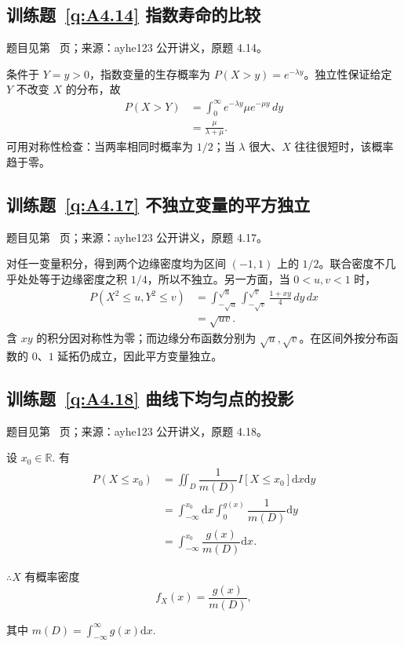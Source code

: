 \documentclass[UTF8,12pt,a4paper,fontset=fandol]{ctexbook}
\begin{document}
\subsection*{训练题~\ref{q:A4.14} 指数寿命的比较}\label{a:A4.14}{\small 题目见第~\pageref{q:A4.14} 页；来源：ayhe123 公开讲义，原题 4.14。}
\begin{solve}条件于 $Y=y>0$，指数变量的生存概率为 $P(X>y)=e^{-\lambda y}$。独立性保证给定 $Y$ 不改变 $X$ 的分布，故\[\begin{aligned}P(X>Y)&=\int_0^\infty e^{-\lambda y}\mu e^{-\mu y}\,dy\\&=\frac\mu{\lambda+\mu}.\end{aligned}\]可用对称性检查：当两率相同时概率为 $1/2$；当 $\lambda$ 很大、$X$ 往往很短时，该概率趋于零。\end{solve}

\subsection*{训练题~\ref{q:A4.17} 不独立变量的平方独立}\label{a:A4.17}{\small 题目见第~\pageref{q:A4.17} 页；来源：ayhe123 公开讲义，原题 4.17。}
\begin{solve}对任一变量积分，得到两个边缘密度均为区间 $(-1,1)$ 上的 $1/2$。联合密度不几乎处处等于边缘密度之积 $1/4$，所以不独立。另一方面，当 $0<u,v<1$ 时，\[\begin{aligned}P(X^2\le u,Y^2\le v)&=\int_{-\sqrt u}^{\sqrt u}\int_{-\sqrt v}^{\sqrt v}\frac{1+xy}{4}\,dy\,dx\\&=\sqrt{uv}.\end{aligned}\]含 $xy$ 的积分因对称性为零；而边缘分布函数分别为 $\sqrt u,\sqrt v$。在区间外按分布函数的 $0$、$1$ 延拓仍成立，因此平方变量独立。\end{solve}

\subsection*{训练题~\ref{q:A4.18} 曲线下均匀点的投影}\label{a:A4.18}{\small 题目见第~\pageref{q:A4.18} 页；来源：ayhe123 公开讲义，原题 4.18。}
\begin{solve}
    设 $x_0\in\mathbb{R}$. 有
    \begin{align*}
        P(X\leq x_0) & =\iint_D\dfrac{1}{m(D)}I[X\leq x_0]\mathrm{d}x\mathrm{d}y \\
        & =\int_{-\infty}^{x_0}\mathrm{d}x\int_0^{g(x)}\dfrac{1}{m(D)}\mathrm{d}y \\
        & =\int_{-\infty}^{x_0}\dfrac{g(x)}{m(D)}\mathrm{d}x.
    \end{align*}

    $\therefore X$ 有概率密度
    \[f_X(x)=\dfrac{g(x)}{m(D)},\]

    其中 $m(D)=\int_{-\infty}^\infty g(x)\mathrm{d}x$.
\end{solve}
\end{document}
